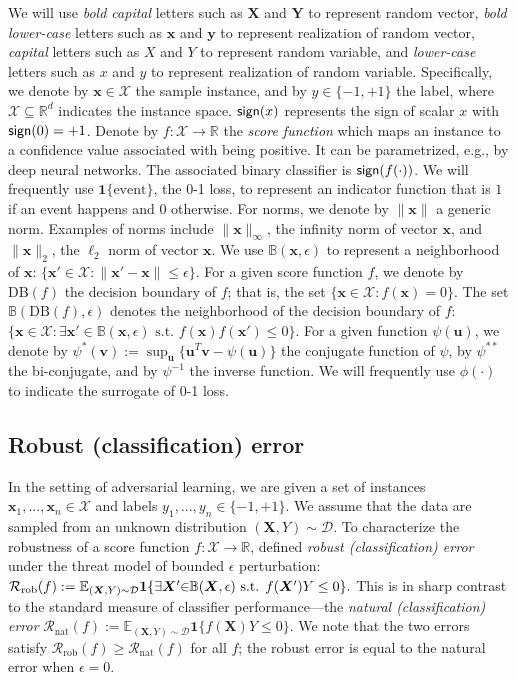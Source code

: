 \documentclass[11pt]{article}
\newcommand{\sign}{\textup{\textsf{sign}}}
\newcommand{\adv}{\mathrm{rob}}
\newcommand{\nat}{\mathrm{nat}}
\newcommand{\boundary}{\mathrm{DB}}
\renewcommand{\u}{\bm{u}}
\renewcommand{\v}{\bm{v}}
\newcommand{\x}{\bm{x}}
\newcommand{\y}{\bm{y}}
\newcommand{\R}{\mathbb{R}}
\newcommand{\X}{\bm{X}}
\newcommand{\Y}{\bm{Y}}
\newcommand{\0}{\mathbf{0}}
\newcommand{\1}{\mathbf{1}}
\newcommand{\cD}{\mathcal{D}}
\newcommand{\cR}{\mathcal{R}}
\newcommand{\cX}{\mathcal{X}}
\newcommand{\bbB}{\mathbb{B}}
\newcommand{\bbE}{\mathbb{E}}
\begin{document}
We will use \emph{bold capital} letters such as $\X$ and $\Y$ to represent random vector, \emph{bold lower-case} letters such as $\x$ and $\y$ to represent realization of random vector, \emph{capital} letters such as $X$ and $Y$ to represent random variable, and \emph{lower-case} letters such as $x$ and $y$ to represent realization of random variable. Specifically, we denote by $\x\in\cX$ the sample instance, and by $y\in\{-1,+1\}$ the label, where $\cX\subseteq \R^d$ indicates the instance space. $\sign(x)$ represents the sign of scalar $x$ with $\sign(0)=+1$. Denote by $f:\cX\rightarrow \R$ the \emph{score function} which maps an instance to a confidence value associated with being positive. It can be parametrized, e.g., by deep neural networks. The associated binary classifier is $\sign(f(\cdot))$. We will frequently use $\1\{\text{event}\}$, the 0-1 loss, to represent an indicator function that is $1$ if an event happens and $0$ otherwise. For norms, we denote by $\|\x\|$ a generic norm. Examples of norms include $\|\x\|_\infty$, the infinity norm of vector $\x$, and $\|\x\|_2$, the $\ell_2$ norm of vector $\x$. We use $\bbB(\x,\epsilon)$ to represent a neighborhood of $\x$: $\{\x'\in\cX:\|\x'-\x\|\le\epsilon\}$. For a given score function $f$, we denote by $\boundary(f)$ the decision boundary of $f$; that is, the set $\{\x\in\cX:f(\x)=0\}$. The set $\bbB(\boundary(f),\epsilon)$ denotes the neighborhood of the decision boundary of $f$: $\{\x\in\cX:\exists \x'\in\bbB(\x,\epsilon)\text{ s.t. } f(\x)f(\x')\le 0\}$. For a given function $\psi(\u)$, we denote by $\psi^*(\v):=\sup_{\u}\{\u^T\v-\psi(\u)\}$ the conjugate function of $\psi$, by $\psi^{**}$ the bi-conjugate, and by $\psi^{-1}$ the inverse function. We will frequently use $\phi(\cdot)$ to indicate the surrogate of 0-1 loss.

\subsection{Robust (classification) error}

In the setting of adversarial learning, we are given a set of instances $\x_1,...,\x_n\in\cX$ and labels $y_1,...,y_n\in\{-1,+1\}$. We assume that the data are sampled from an unknown distribution $(\X,Y)\sim\cD$. To characterize the robustness of a score function $f: \cX\rightarrow\R$, \cite{schmidt2018adversarially,NIPS2018_7307,bubeck2018adversarial1} defined \emph{robust (classification) error} under the threat model of bounded $\epsilon$ perturbation:
$
\cR_\adv(f):=\bbE_{(\X,Y)\sim\cD}\1\{\exists \X'\hspace{-0.1cm}\in\hspace{-0.1cm}\bbB(\X,\epsilon) \text{ s.t. } f(\X')Y\le 0\}.
$
This is in sharp contrast to the standard measure of  classifier performance---the \emph{natural (classification) error}
$
    \cR_\nat(f):=\bbE_{(\X,Y)\sim\cD}\1\{f(\X)Y\le 0\}.
$
We note that the two errors satisfy $\cR_\adv(f)\ge\cR_\nat(f)$ for all $f$; the robust error is equal to the natural error when $\epsilon=0$. 
\end{document}
